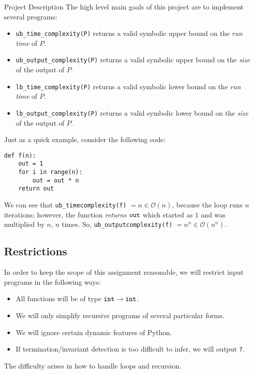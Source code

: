 \documentclass{mfcs}
\begin{document}
\begin{question}{Project Description}
The high level main goals of this project are to implement several programs:
\begin{itemize}
    \item \verb+ub_time_complexity(P)+ returns a valid symbolic upper bound on the \emph{run time} of $P$.
    \item \verb+ub_output_complexity(P)+ returns a valid symbolic upper bound on the \emph{size} of the output of $P$.
    \item \verb+lb_time_complexity(P)+ returns a valid symbolic lower bound on the \emph{run time} of $P$.
    \item \verb+lb_output_complexity(P)+ returns a valid symbolic lower bound on the \emph{size} of the output of $P$.
\end{itemize}

Just as a quick example, consider the following code:
\begin{lstlisting}
def f(n):
    out = 1
    for i in range(n):
        out = out * n
    return out
\end{lstlisting}

We can see that \verb+ub_timecomplexity(f)+ $=n \in \mathcal{O}(n)$, because the loop runs $n$ iterations; however, the function \emph{returns} $\verb+out+$ which
started as $1$ and was multiplied by $n$, $n$ times.  So, \verb+ub_outputcomplexity(f)+ $=n^n \in \mathcal{O}(n^n)$.

{\color{colour}\subsection{Restrictions}}

In order to keep the scope of this assignment reasonable, we will restrict input programs in the following ways:
\begin{itemize}
    \item All functions will be of type $\verb+int+ \to \verb+int+$.
    \item We will only simplify recursive programs of several particular forms.
    \item We will ignore certain dynamic features of Python.
    \item If termination/invariant detection is too difficult to infer, we will output \verb+?+.
\end{itemize}
\end{question}

The difficulty arises in how to handle loops and recursion.
\end{document}
